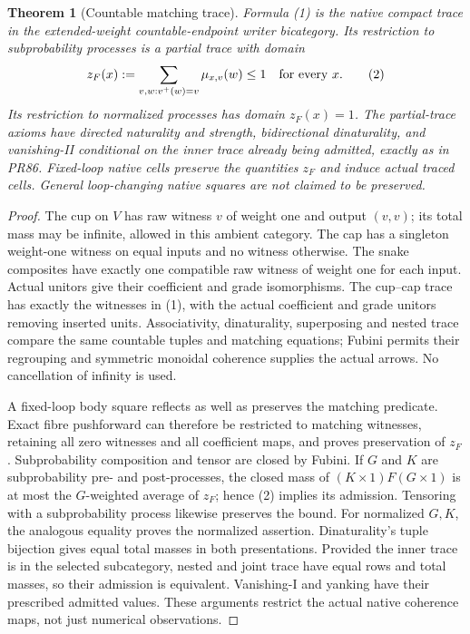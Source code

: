 \documentclass[11pt]{article}
\newtheorem{theorem}{Theorem}\newtheorem{proposition}[theorem]{Proposition}
\begin{document}
\begin{theorem}[Countable matching trace]
Formula (1) is the native compact trace in the extended-weight countable-endpoint writer bicategory. Its restriction to subprobability processes is a partial trace with domain
\[
 z_F(x):=\sum_{v,w:v^+(w)=v}\mu_{x,v}(w)\leq1
 \quad\hbox{for every }x.                                \tag{2}
\]
Its restriction to normalized processes has domain $z_F(x)=1$. The partial-trace axioms have directed naturality and strength, bidirectional dinaturality, and vanishing-II conditional on the inner trace already being admitted, exactly as in PR86. Fixed-loop native cells preserve the quantities $z_F$ and induce actual traced cells. General loop-changing native squares are not claimed to be preserved.
\end{theorem}
\begin{proof}
The cup on $V$ has raw witness $v$ of weight one and output $(v,v)$; its total mass may be infinite, allowed in this ambient category. The cap has a singleton weight-one witness on equal inputs and no witness otherwise. The snake composites have exactly one compatible raw witness of weight one for each input. Actual unitors give their coefficient and grade isomorphisms. The cup--cap trace has exactly the witnesses in (1), with the actual coefficient and grade unitors removing inserted units. Associativity, dinaturality, superposing and nested trace compare the same countable tuples and matching equations; Fubini permits their regrouping and symmetric monoidal coherence supplies the actual arrows. No cancellation of infinity is used.

A fixed-loop body square reflects as well as preserves the matching predicate. Exact fibre pushforward can therefore be restricted to matching witnesses, retaining all zero witnesses and all coefficient maps, and proves preservation of $z_F$. Subprobability composition and tensor are closed by Fubini. If $G$ and $K$ are subprobability pre- and post-processes, the closed mass of $(K\times1)F(G\times1)$ is at most the $G$-weighted average of $z_F$; hence (2) implies its admission. Tensoring with a subprobability process likewise preserves the bound. For normalized $G,K$, the analogous equality proves the normalized assertion. Dinaturality's tuple bijection gives equal total masses in both presentations. Provided the inner trace is in the selected subcategory, nested and joint trace have equal rows and total masses, so their admission is equivalent. Vanishing-I and yanking have their prescribed admitted values. These arguments restrict the actual native coherence maps, not just numerical observations.
\end{proof}
\end{document}
